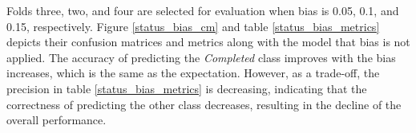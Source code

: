 \documentclass[12pt,twoside]{report}
\begin{document}
Folds three, two, and four are selected for evaluation when bias is 0.05, 0.1, and 0.15, respectively. Figure \ref{status_bias_cm} and table \ref{status_bias_metrics} depicts their confusion matrices and metrics along with the model that bias is not applied. The accuracy of predicting the \textit{Completed} class improves with the bias increases, which is the same as the expectation. However, as a trade-off, the precision in table \ref{status_bias_metrics} is decreasing, indicating that the correctness of predicting the other class decreases, resulting in the decline of the overall performance.
\\

\begin{figure}[!htbp]
	\centering
	\hfil
	\hfill

\end{figure}
\end{document}
